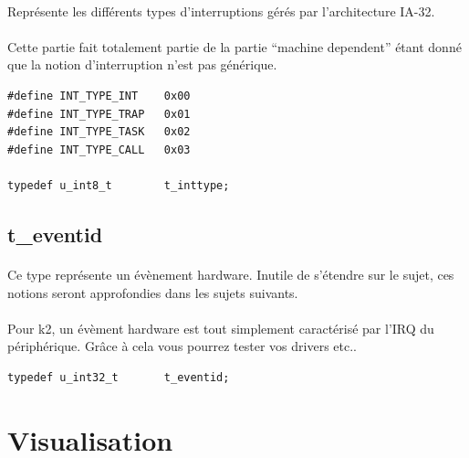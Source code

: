 \documentclass[10pt,a4wide]{article}
\begin{document}
\paragraph{}

Repr\'esente les diff\'erents types d'interruptions g\'er\'es par
l'architecture IA-32.

\paragraph{}

Cette partie fait totalement partie de la partie ``machine dependent''
\'etant donn\'e que la notion d'interruption n'est pas g\'en\'erique.

\begin{verbatim}
#define INT_TYPE_INT    0x00
#define INT_TYPE_TRAP   0x01
#define INT_TYPE_TASK   0x02
#define INT_TYPE_CALL   0x03

typedef u_int8_t        t_inttype;
\end{verbatim}

\subsection{t\_eventid}

\paragraph{}

Ce type repr\'esente un \'ev\`enement hardware. Inutile de s'\'etendre sur
le sujet, ces notions seront approfondies dans les sujets suivants.

\paragraph{}

Pour k2, un \'ev\`ement hardware est tout simplement caract\'eris\'e par
l'IRQ du p\'eriph\'erique. Gr\^ace \`a cela vous pourrez tester vos
drivers etc..

\begin{verbatim}
typedef u_int32_t       t_eventid;
\end{verbatim}

\newpage

\section{Visualisation}

\paragraph{}
\end{document}

